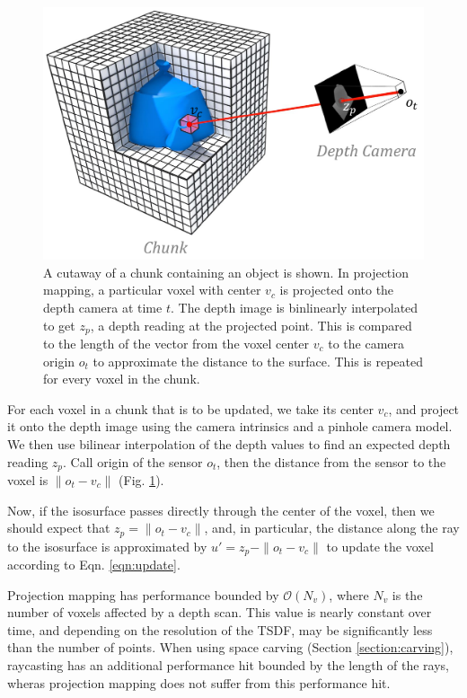 \documentclass[conference,10pt]{IEEEtran}
\begin{document}
\begin{figure}[t]
  \centering
    \includegraphics[width=0.95\columnwidth]{img/projection_mapping}
      \caption{A cutaway of a chunk containing an object is shown. In projection
      mapping,  a particular voxel with center $v_c$ is projected onto the depth
      camera at time $t$. The depth image is binlinearly interpolated to get
      $z_p$, a depth reading at the projected point. This is compared to the length of the vector
      from the voxel center $v_c$ to the camera origin $o_t$ to approximate the
      distance to the surface. This is repeated for every voxel in the chunk.}
  \label{fig:projection_mapping} 
\end{figure} 


For each voxel in a chunk that is to be updated, we take its center $v_c$, and
project it onto the depth image using the camera intrinsics and a pinhole camera
model. We then use bilinear interpolation of the depth values to find an
expected depth reading $z_p$. Call origin of the sensor  $o_t$,   then the
distance from the sensor to the voxel is $\|o_t - v_c\|$ (Fig. \ref{fig:projection_mapping}).

Now, if the isosurface passes directly through the center of the voxel,
then we should expect that $z_p = \|o_t - v_c\|$, and, in particular, the
distance along the ray to the isosurface is approximated by $u' = z_p - \|o_t -
v_c\|$ to update the voxel according to Eqn. \ref{eqn:update}.

Projection mapping has performance bounded by $\mathcal{O}(N_v)$, where $N_v$ is
the number of voxels affected by a depth scan. This value is nearly constant
over time, and depending on the resolution of the TSDF, may be significantly
less than the number of points. When using space carving (Section
\ref{section:carving}), raycasting has an additional performance hit bounded by
the length of the rays, wheras projection mapping does not suffer from this
performance hit.
\end{document}
